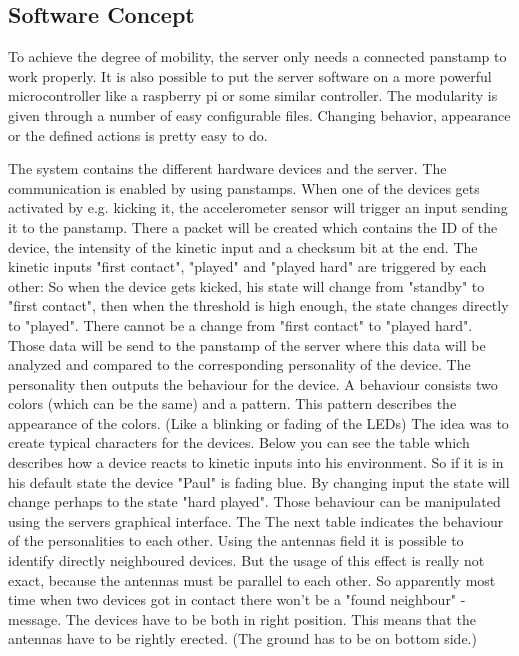 \subsection{Software Concept} 

To achieve the degree of mobility, the server only needs a connected panstamp to work properly. It is also possible to put the server software on a more powerful microcontroller like a raspberry pi or some similar controller.
The modularity is given through a number of easy configurable files. Changing behavior, appearance or the defined actions is pretty easy to do.

The system contains the different hardware devices and the server. The communication is enabled by using panstamps. When one of the devices gets activated by e.g. kicking it, the accelerometer sensor will trigger an input sending it to the panstamp. There a packet will be created which contains the ID of the device, the intensity of the kinetic input and a checksum bit at the end.
The kinetic inputs "first contact", "played" and "played hard" are triggered by each other:
So when the device gets kicked, his state will change from "standby" to "first contact", then when the threshold is high enough, the state changes directly to "played". There cannot be a change from "first contact" to "played hard". 
Those data will be send to the panstamp of the server where this data will be analyzed and compared to the corresponding personality of the device. The personality then outputs the behaviour for the device. A behaviour consists two colors (which can be the same) and a pattern. This pattern describes the appearance of the colors. (Like a blinking or fading of the LEDs)
The idea was to create typical characters for the devices. Below you can see the table which describes how a device reacts to kinetic inputs into his environment. So if it is in his default state the device "Paul" is fading blue. By changing input the state will change perhaps to the state "hard played". Those behaviour can be manipulated using the servers graphical interface. The %
The next table indicates the behaviour of the personalities to each other. Using the antennas field  it is possible to identify directly neighboured devices. But the usage of this effect is really not exact, because the antennas must be parallel to each other. So apparently most time when two devices got in contact there won't be a "found neighbour" - message. The devices have to be both in right position. This means that the antennas have to be rightly erected. (The ground has to be on bottom side.)   
